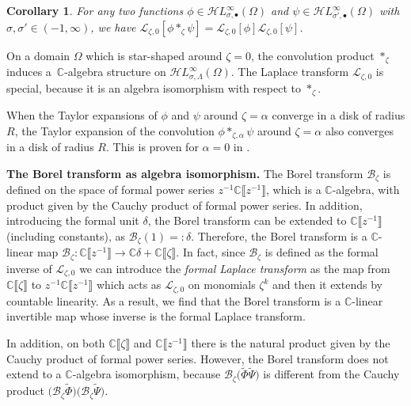 \documentclass[10pt,a4paper]{amsart}
\newcommand{\singexp}[2]{\mathcal{H}L^\infty_{#1, #2}}
\newcommand{\singexpalg}[1]{\singexp{#1}{\bullet}}
\newcommand{\maps}{\colon}
\newcommand{\C}{\mathbb{C}}
\newcommand{\series}[1]{\tilde{#1}}
\newcommand{\laplace}{\mathcal{L}}
\newcommand{\borel}{\mathcal{B}}
\numberwithin{equation}{section}
\newtheorem{Corollary}[Theorem]{Corollary}
\begin{document}
\begin{Corollary}\label{prop:convolution_iso_laplace}
For any two functions $\phi \in \singexpalg{\sigma}(\Omega)$ and $\psi \in \singexpalg{\sigma'}(\Omega)$ with $\sigma, \sigma' \in (-1, \infty)$, we have
$%
\laplace_{\zeta,0}[\phi\ast_{\zeta}\psi]=\laplace_{\zeta,0}[\phi] \laplace_{\zeta,0}[\psi]$.
\end{Corollary}

On a domain $\Omega$ which is star-shaped around $\zeta = 0$, the convolution product $\ast_{\zeta}$ induces a~$\C$-algebra structure on $\singexp{\sigma}{\Lambda}(\Omega)$. The Laplace transform $\laplace_{\zeta, 0}$ is special, because it is an algebra isomorphism with respect to $\ast_{\zeta}$.
\begin{Remark}
When the Taylor expansions of $\phi$ and $\psi$ around $\zeta=\alpha$ converge in a disk of radius $R$, the Taylor expansion of the convolution $\phi\ast_{\zeta,\alpha}\psi$ around $\zeta=\alpha$ also converges in a disk of radius $R$. This is proven for $\alpha = 0$ in \cite[Lemma~5.14]{diverg-resurg-i}.
\end{Remark}

{\bf The Borel transform as algebra isomorphism.}
The Borel transform $\borel_\zeta$ is defined on the space of formal power series $z^{-1}\C\big\llbracket z^{-1}\big\rrbracket$, which is a $\C$-algebra, with product given by the Cauchy product of formal power series. In addition, introducing the formal unit $\delta$, the Borel transform can be extended to $\C\big\llbracket z^{-1}\big\rrbracket$ (including constants), as $\borel_\zeta(1)=:\delta$. Therefore, the Borel transform is a $\C$-linear map
$\borel_\zeta\maps\C\big\llbracket z^{-1}\big\rrbracket\to\C\delta + \C\llbracket\zeta\rrbracket$.
In fact, since $\borel_\zeta$ is defined as the formal inverse of $\laplace_{\zeta,0}$ we can introduce the \textit{formal Laplace transform} as the map from $\C\llbracket \zeta\rrbracket$ to $z^{-1}\C\big\llbracket z^{-1}\big\rrbracket$ which acts as $\laplace_{\zeta,0}$ on monomials $\zeta^k$ and then it extends by countable linearity. As a result, we find that the Borel transform is a $\C$-linear invertible map whose inverse is the formal Laplace transform.

In addition, on both $\C\llbracket\zeta\rrbracket$ and $\C\big\llbracket z^{-1}\big\rrbracket$ there is the natural product given by the Cauchy product of formal power series. However, the Borel transform does not extend to a $\C$-algebra isomorphism, because $\borel_\zeta\bigl(\series{\Phi}\series{\Psi}\bigr)$ is different from the Cauchy product $\bigl(\borel_\zeta \series{\Phi}\bigr)\bigl(\borel_\zeta \series{\Psi}\bigr)$.
\end{document}
